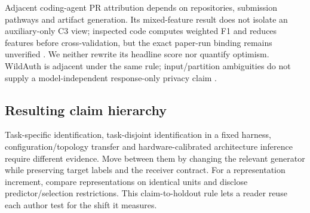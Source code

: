 Adjacent coding-agent PR attribution depends on repositories, submission pathways and artifact generation. Its mixed-feature result does not isolate an auxiliary-only C3 view; inspected code computes weighted F1 and reduces features before cross-validation, but the exact paper-run binding remains unverified \cite{ghaleb2026codingfingerprint}. We neither rewrite its headline score nor quantify optimism. WildAuth is adjacent under the same rule; input/partition ambiguities do not supply a model-independent response-only privacy claim \cite{wang2026dialogue}.

\subsection{Resulting claim hierarchy}
Task-specific identification, task-disjoint identification in a fixed harness, configuration/topology transfer and hardware-calibrated architecture inference require different evidence. Move between them by changing the relevant generator while preserving target labels and the receiver contract. For a representation increment, compare representations on identical units and disclose predictor/selection restrictions. This claim-to-holdout rule lets a reader reuse each author test for the shift it measures.
